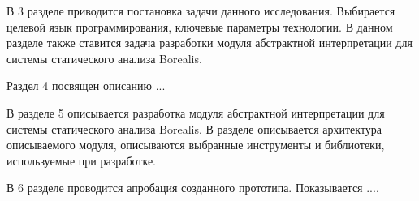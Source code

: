 В 3 разделе приводится постановка задачи данного исследования. Выбирается 
целевой язык программирования, ключевые параметры технологии. В данном разделе 
также ставится задача разработки модуля абстрактной интерпретации для системы 
статического анализа Borealis.

Раздел 4 посвящен описанию ...

В разделе 5 описывается разработка модуля абстрактной интерпретации для системы 
статического анализа Borealis. В разделе описывается архитектура описываемого 
модуля, описываются выбранные инструменты и библиотеки, используемые при 
разработке.

В 6 разделе проводится апробация созданного прототипа. Показывается ....